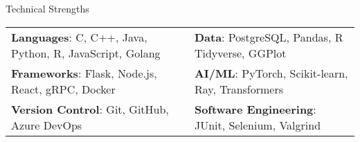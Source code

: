 \begin{rSection}{Technical Strengths}
	\begin{tabular}{ll}
		\textbf{Languages}: C, C++, Java, Python, R, JavaScript, Golang &   
		\textbf{Data}: PostgreSQL, Pandas, R Tidyverse, GGPlot
		\\
		\textbf{Frameworks}: Flask, Node.js, React, gRPC, Docker &   
		\textbf{AI/ML}: PyTorch, Scikit-learn, Ray, Transformers 
		\\
		\textbf{Version Control}: Git, GitHub, Azure DevOps &   
		\textbf{Software Engineering}: JUnit, Selenium, Valgrind
	\end{tabular}
\end{rSection}